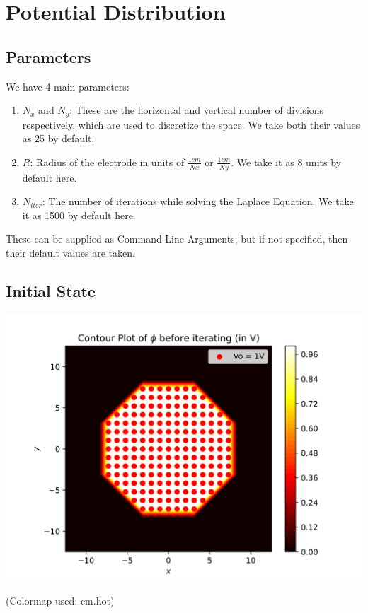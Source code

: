 \documentclass[12pt]{article}
\begin{document}
\section{Potential Distribution}

\subsection{Parameters}

We have 4 main parameters:

\begin{enumerate}
    \item $N_x$ and $N_y$: These are the horizontal and vertical number of divisions respectively, which are used to discretize the space. We take both their values as 25 by default.
    \item $R$: Radius of the electrode in units of $\frac{1cm}{Nx}$ or $\frac{1cm}{Ny}$. We take it as 8 units by default here.
    \item $N_{iter}$: The number of iterations while solving the Laplace Equation. We take it as 1500 by default here.
\end{enumerate}

These can be supplied as Command Line Arguments, but if not specified, then their default values are taken.

\subsection{Initial State}
\begin{center}
\includegraphics{images/fig1.png}
\end{center}
\tiny{(Colormap used: cm.hot)}
\end{document}
